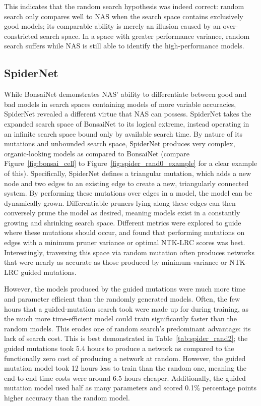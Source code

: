 This indicates that the random search hypothesis was indeed correct: random search only compares well to NAS when
the search space contains exclusively good models; its comparable ability is merely an illusion caused by an over-constricted
search space. In a space with greater performance variance, random search suffers while NAS is still able to identify
the high-performance models.

\subsection{SpiderNet}
While BonsaiNet demonstrates NAS' ability to differentiate between good and bad models in search spaces containing models
of more variable accuracies, SpiderNet revealed a different virtue that NAS can possess. SpiderNet takes the expanded
search space of BonsaiNet to its logical extreme, instead operating in an infinite search space bound only by available search
time. By nature of its mutations and unbounded search space, SpiderNet produces very complex, organic-looking
models as compared to BonsaiNet (compare Figure~\ref{fig:bonsai_cell} to Figure~\ref{fig:spider_rand0_example}
for a clear example of this). Specifically, SpiderNet defines a triangular mutation, which adds a new node and two
edges to an existing edge to create a new, triangularly connected system. By performing these mutations over edges
in a model, the model can be dynamically grown. Differentiable pruners lying along these edges can then
conversely prune the model as desired, meaning models exist in a constantly growing and shrinking search space.
Different metrics were explored to guide where these mutations should occur, and found that performing mutations on edges
with a minimum pruner variance or optimal NTK-LRC scores was best. Interestingly, traversing this space via random mutation
often produces networks that were nearly as accurate as those produced by minimum-variance or NTK-LRC guided mutations.

However, the models produced by the guided mutations were much more time and parameter efficient than the randomly
generated models. Often, the few hours that a guided-mutation search took were made up for during training, as the much
more time-efficient model could train significantly faster than the random models. This erodes one of random search's
predominant advantage: its lack of search cost. This is best demonstrated in Table~\ref{tab:spider_rand2}; the guided
mutations took 5.4 hours to produce a network as compared to the functionally zero cost of producing a network at random.
However, the guided mutation model took 12 hours less to train than the random one, meaning the end-to-end time costs
were around 6.5 hours cheaper. Additionally, the guided mutation model used half as many parameters and scored 0.1\% percentage
points higher accuracy than the random model.


